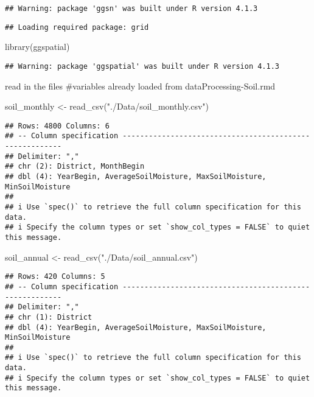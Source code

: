 \documentclass[
]{article}
\newenvironment{Shaded}{\begin{snugshade}}{\end{snugshade}}
\newcommand{\FunctionTok}[1]{\textcolor[rgb]{0.00,0.00,0.00}{#1}}
\newcommand{\NormalTok}[1]{#1}
\newcommand{\OtherTok}[1]{\textcolor[rgb]{0.56,0.35,0.01}{#1}}
\newcommand{\StringTok}[1]{\textcolor[rgb]{0.31,0.60,0.02}{#1}}
\begin{document}
\begin{verbatim}
## Warning: package 'ggsn' was built under R version 4.1.3
\end{verbatim}

\begin{verbatim}
## Loading required package: grid
\end{verbatim}

\begin{Shaded}
\begin{Highlighting}[]
\FunctionTok{library}\NormalTok{(ggspatial)}
\end{Highlighting}
\end{Shaded}

\begin{verbatim}
## Warning: package 'ggspatial' was built under R version 4.1.3
\end{verbatim}

read in the files \#variables already loaded from
dataProcessing-Soil.rmd

\begin{Shaded}
\begin{Highlighting}[]
\NormalTok{soil\_monthly }\OtherTok{\textless{}{-}} \FunctionTok{read\_csv}\NormalTok{(}\StringTok{"./Data/soil\_monthly.csv"}\NormalTok{)}
\end{Highlighting}
\end{Shaded}

\begin{verbatim}
## Rows: 4800 Columns: 6
## -- Column specification --------------------------------------------------------
## Delimiter: ","
## chr (2): District, MonthBegin
## dbl (4): YearBegin, AverageSoilMoisture, MaxSoilMoisture, MinSoilMoisture
## 
## i Use `spec()` to retrieve the full column specification for this data.
## i Specify the column types or set `show_col_types = FALSE` to quiet this message.
\end{verbatim}

\begin{Shaded}
\begin{Highlighting}[]
\NormalTok{soil\_annual }\OtherTok{\textless{}{-}} \FunctionTok{read\_csv}\NormalTok{(}\StringTok{"./Data/soil\_annual.csv"}\NormalTok{)}
\end{Highlighting}
\end{Shaded}

\begin{verbatim}
## Rows: 420 Columns: 5
## -- Column specification --------------------------------------------------------
## Delimiter: ","
## chr (1): District
## dbl (4): YearBegin, AverageSoilMoisture, MaxSoilMoisture, MinSoilMoisture
## 
## i Use `spec()` to retrieve the full column specification for this data.
## i Specify the column types or set `show_col_types = FALSE` to quiet this message.
\end{verbatim}
\end{document}
